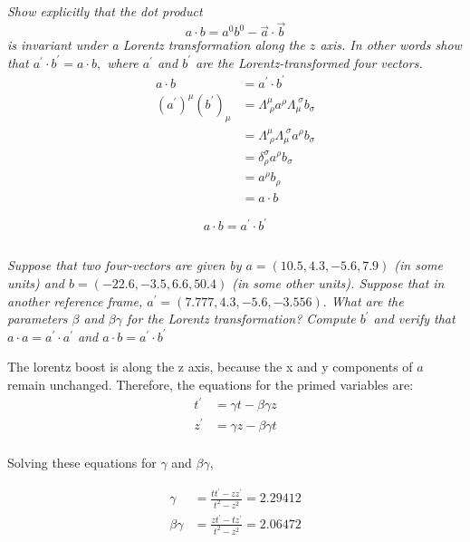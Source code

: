 \documentclass{article}
\begin{document}
\subsection{}
\textit{Show explicitly that the dot product
$$
a \cdot b=a^{0} b^{0}-\vec{a} \cdot \vec{b}
$$
is invariant under a Lorentz transformation along the $z$ axis. In other words show that $a^{\prime} \cdot b^{\prime}=a \cdot b,$ where $a^{\prime}$ and $b^{\prime}$ are the Lorentz-transformed four vectors.}
\begin{align*}
    a \cdot b&=a^{\prime} \cdot b^{\prime}\\
    (a^\prime)^{\mu} (b^\prime)_{\mu}&=\Lambda_{\;\rho}^{\mu} a^{\rho} \Lambda_{\mu}^{\;\sigma} b_{\sigma}\\
    &=\Lambda^{\mu} _{\;\rho} \Lambda_{\mu}^{\;\sigma} a^{\rho} b_{\sigma}\\
    &=\delta_{\rho}^{\sigma} a^{\rho} b_{\sigma} \\
    &= a^{\rho} b_{\rho} \\
    &= a \cdot b
\end{align*}

\begin{equation*}
    \boxed{ a \cdot b=a^{\prime} \cdot b^{\prime}}
\end{equation*}

\subsection{}
\textit{Suppose that two four-vectors are given by $a=(10.5,4.3,-5.6,7.9)$ (in some units) and $b=(-22.6,-3.5,6.6,50.4)$ (in some other units). Suppose that in another reference frame, $a^{\prime}=(7.777,4.3,-5.6,-3.556) .$ What are the parameters $\beta$ and $\beta \gamma$ for the Lorentz transformation? Compute $b^{\prime}$ and verify that $a \cdot a=a^{\prime} \cdot a^{\prime}$ and $a \cdot b=a^{\prime} \cdot b^{\prime}$}

The lorentz boost is along the z axis, because the x and y components of $a$ remain unchanged. Therefore, the equations for the primed variables are: 
\begin{align*}
t^{\prime}&=\gamma t-\beta \gamma z \\
z^{\prime}&=\gamma z-\beta \gamma t \\
\end{align*}

Solving these equations for $\gamma$ and $\beta\gamma$,

\begin{align*}
\gamma&=\frac{t t^{\prime}-z z^{\prime}}{t^{2}-z^{2}}=2.29412 \\
\beta \gamma&=\frac{z t^{\prime}-t z^{\prime}}{t^{2}-z^{2}}=2.06472
\end{align*}
\end{document}
